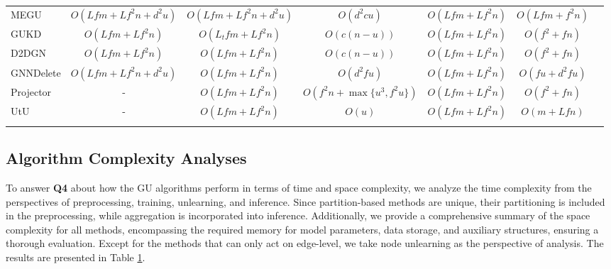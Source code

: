 \begin{table}[t]
{\begin{tabular}{l|cccccc}
 MEGU          & $O(Lfm \!+ \!Lf^2n\!+\!d^2u)$                                             & $O(Lfm \!+ \!Lf^2n \!+ \!d^2u)$            &  $O(d^2cu)$     & $O(Lfm \!+\! Lf^2n)$ & $O(Lfm \!+ \!f^2n)$ \\
 GUKD          &   $O(Lfm\!+\!Lf^2n)$                                             &$O(L_t fm\!+\!Lf^2n)$                        & $O(c(n\!-\!u))$                     & $O(Lfm \!+\! Lf^2n)$  & $O(f^2\!+\!fn)$\\
 D2DGN         &       $O(Lfm\!+\!Lf^2n)$                    &  $O(Lfm\!+\!Lf^2n) $                     &              $O(c(n\!-\!u))$         & $O(Lfm \!+\! Lf^2n)$  & $O(f^2\!+\!fn)$ \\
 GNNDelete     & $O(Lfm\! +\! Lf^2n \!+\!d^2u)$                                             & $O(Lfm \!+\! Lf^2n)$             & $O(d^2fu)$ & $O(Lfm \!+\! Lf^2n)$ & $O(fu \!+ \!d^2\!fu)$ \\ \arrayrulecolor{myblue4}\midrule[0.08em] \addlinespace[-1.5pt] 
\arrayrulecolor{under} \midrule[0.08em]
 Projector     & -                                             & $O(Lfm \!+\! Lf^2n)$           & $O(f^2n \!+\! \max\{u^3\!, \!f^2u\})$ & $O(Lfm \!+\! Lf^2n)$  & $O(f^2 \!+ \!fn)$ \\
 UtU           & -                                             & $O(Lfm \!+\! Lf^2n)$                          & $O(u)$                        & $O(Lfm \!+\! Lf^2n)$  & $O(m \!+\! Lfn)$ \\ 
 \arrayrulecolor{myblue5}\bottomrule[0.16em]
\end{tabular}%
}
\label{complex}
\vspace{-0.15cm}
\end{table}



\vspace{-1.5em}
\subsection{Algorithm Complexity Analyses}
To answer \textbf{Q4} about how the GU algorithms perform in terms of time and space complexity, we analyze the time complexity from the perspectives of preprocessing, training, unlearning, and inference. Since partition-based methods are unique, their partitioning is included in the preprocessing, while aggregation is incorporated into inference.
Additionally, we provide a comprehensive summary of the space complexity for all methods, encompassing the required memory for model parameters, data storage, and auxiliary structures, ensuring a thorough evaluation. Except for the methods that can only act on edge-level, we take node unlearning as the perspective of analysis. The results are presented in Table \ref{complex}.




